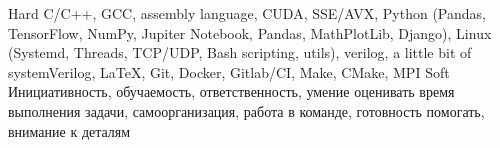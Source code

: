 

\begin{cvskills}

  \cvskill
    {Hard} %
    {C/C++, GCC, assembly language, CUDA, SSE/AVX, Python (Pandas, TensorFlow, NumPy, Jupiter Notebook, Pandas, MathPlotLib, Django), Linux (Systemd, Threads, TCP/UDP, Bash scripting, utils), verilog, a little bit of systemVerilog, \LaTeX, Git, Docker, Gitlab/CI, Make, CMake, MPI} %
  \cvskill
    {Soft} %
    {Инициативность, обучаемость, ответственность, умение оценивать время выполнения задачи, самоорганизация, работа в команде, готовность помогать, внимание к деталям} %

\end{cvskills}
